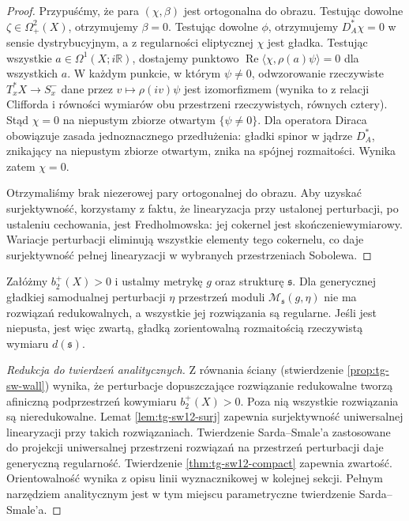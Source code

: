 \begin{proof}
Przypuśćmy, że para $(\chi,\beta)$ jest ortogonalna
do obrazu. Testując dowolne $\zeta\in\Omega^2_+(X)$,
otrzymujemy $\beta=0$. Testując dowolne $\phi$,
otrzymujemy $D_A^*\chi=0$ w sensie dystrybucyjnym,
a z regularności eliptycznej $\chi$ jest gładka.
Testując wszystkie $a\in\Omega^1(X;i\mathbb R)$,
dostajemy punktowo
$\operatorname{Re}\langle\chi,\rho(a)\psi\rangle=0$
dla wszystkich $a$. W każdym punkcie, w którym $\psi\ne0$,
odwzorowanie rzeczywiste
$T_x^*X\to S_x^-$ dane przez $v\mapsto\rho(iv)\psi$
jest izomorfizmem (wynika to z relacji Clifforda i równości
wymiarów obu przestrzeni rzeczywistych, równych cztery).
Stąd $\chi=0$ na niepustym zbiorze otwartym
$\{\psi\ne0\}$. Dla operatora Diraca obowiązuje
zasada jednoznacznego przedłużenia: gładki spinor w jądrze
$D_A^*$, znikający na niepustym zbiorze otwartym,
znika na spójnej rozmaitości. Wynika zatem $\chi=0$.

Otrzymaliśmy brak niezerowej pary ortogonalnej do obrazu.
Aby uzyskać surjektywność, korzystamy z faktu, że
linearyzacja przy ustalonej perturbacji, po ustaleniu
cechowania, jest Fredholmowska: jej cokernel jest
skończeniewymiarowy. Wariacje perturbacji eliminują
wszystkie elementy tego cokernelu, co daje surjektywność
pełnej linearyzacji w wybranych przestrzeniach Sobolewa.
\end{proof}

\begin{twierdzenie}
\label{thm:tg-sw12-regular}
Załóżmy $b_2^+(X)>0$ i ustalmy metrykę $g$ oraz
strukturę $\mathfrak s$. Dla generycznej gładkiej
samodualnej perturbacji $\eta$ przestrzeń moduli
$\mathcal M_{\mathfrak s}(g,\eta)$ nie ma rozwiązań
redukowalnych, a wszystkie jej rozwiązania są regularne.
Jeśli jest niepusta, jest więc zwartą, gładką
zorientowalną rozmaitością rzeczywistą wymiaru
$d(\mathfrak s)$.
\end{twierdzenie}

\begin{proof}[Redukcja do twierdzeń analitycznych]
Z równania ściany (stwierdzenie \ref{prop:tg-sw-wall})
wynika, że perturbacje dopuszczające rozwiązanie
redukowalne tworzą afiniczną podprzestrzeń kowymiaru
$b_2^+(X)>0$. Poza nią wszystkie rozwiązania są
nieredukowalne. Lemat \ref{lem:tg-sw12-surj} zapewnia
surjektywność uniwersalnej linearyzacji przy takich
rozwiązaniach. Twierdzenie Sarda--Smale'a zastosowane
do projekcji uniwersalnej przestrzeni rozwiązań
na przestrzeń perturbacji daje generyczną regularność.
Twierdzenie \ref{thm:tg-sw12-compact} zapewnia zwartość.
Orientowalność wynika z opisu linii wyznacznikowej
w kolejnej sekcji. Pełnym narzędziem analitycznym jest
w tym miejscu parametryczne twierdzenie Sarda--Smale'a.
\end{proof}

